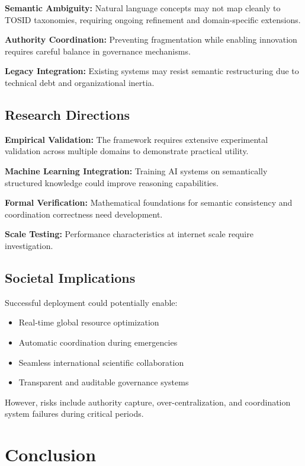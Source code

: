 \documentclass[conference]{IEEEtran}
\begin{document}
\textbf{Semantic Ambiguity:} Natural language concepts may not map cleanly to TOSID taxonomies, requiring ongoing refinement and domain-specific extensions.

\textbf{Authority Coordination:} Preventing fragmentation while enabling innovation requires careful balance in governance mechanisms.

\textbf{Legacy Integration:} Existing systems may resist semantic restructuring due to technical debt and organizational inertia.

\subsection{Research Directions}

\textbf{Empirical Validation:} The framework requires extensive experimental validation across multiple domains to demonstrate practical utility.

\textbf{Machine Learning Integration:} Training AI systems on semantically structured knowledge could improve reasoning capabilities.

\textbf{Formal Verification:} Mathematical foundations for semantic consistency and coordination correctness need development.

\textbf{Scale Testing:} Performance characteristics at internet scale require investigation.

\subsection{Societal Implications}

Successful deployment could potentially enable:

\begin{itemize}
\item Real-time global resource optimization
\item Automatic coordination during emergencies
\item Seamless international scientific collaboration
\item Transparent and auditable governance systems
\end{itemize}

However, risks include authority capture, over-centralization, and coordination system failures during critical periods.

\section{Conclusion}
\end{document}
